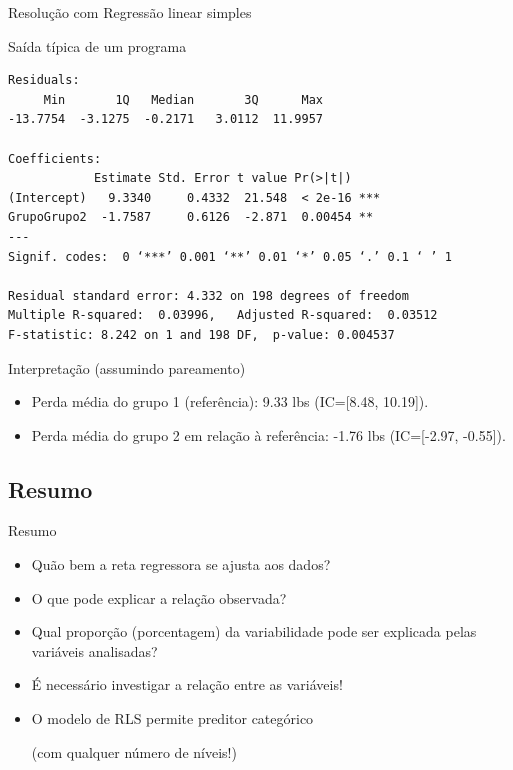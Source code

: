 \documentclass{beamer}
\begin{document}
\begin{frame}[fragile]{\small Resolução com Regressão linear simples}
  \begin{exampleblock}{Saída típica de um programa}
    \tiny
\begin{verbatim}
Residuals:
     Min       1Q   Median       3Q      Max 
-13.7754  -3.1275  -0.2171   3.0112  11.9957 

Coefficients:
            Estimate Std. Error t value Pr(>|t|)    
(Intercept)   9.3340     0.4332  21.548  < 2e-16 ***
GrupoGrupo2  -1.7587     0.6126  -2.871  0.00454 ** 
---
Signif. codes:  0 ‘***’ 0.001 ‘**’ 0.01 ‘*’ 0.05 ‘.’ 0.1 ‘ ’ 1

Residual standard error: 4.332 on 198 degrees of freedom
Multiple R-squared:  0.03996,	Adjusted R-squared:  0.03512 
F-statistic: 8.242 on 1 and 198 DF,  p-value: 0.004537
\end{verbatim}
  \end{exampleblock}
  \begin{exampleblock}{\small Interpretação (assumindo pareamento)}
    \begin{itemize}
      \scriptsize
    \item Perda média do grupo 1 (referência): 9.33 lbs {\tiny (IC=[8.48, 10.19])}.
    \item Perda média do grupo 2 em relação à referência: -1.76 lbs {\tiny (IC=[-2.97, -0.55])}.
    \end{itemize}
  \end{exampleblock}
\end{frame}

\subsection{Resumo}

\begin{frame}{Resumo}
  \begin{itemize}
  \item Quão bem a reta regressora se ajusta aos dados?
    \medskip
  \item O que pode explicar a relação observada?
    \medskip
  \item Qual proporção (porcentagem) da variabilidade pode ser
    explicada pelas variáveis analisadas?
    \medskip
  \item É necessário investigar a relação entre as variáveis!
    \bigskip
    \bigskip
  \item O modelo de RLS permite preditor categórico

    {\footnotesize (com qualquer número de níveis!)}
  \end{itemize}
\end{frame}
\end{document}
